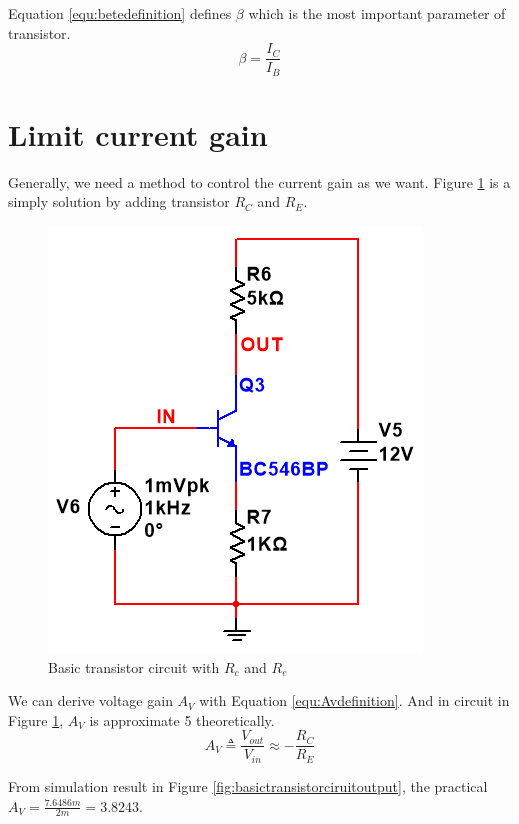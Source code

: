  Equation \ref{equ:betedefinition} defines $\beta$ which is the most important parameter of transistor.  
\begin{equation}
\beta = \frac{I_C}{I_B}
\label{equ:betedefinition}
\end{equation}


\section{Limit current gain} 
Generally, we need a method to control the current gain as we want. Figure \ref{fig:basictransistorcircuitwithRcandRe} is a simply solution by adding transistor $R_C$ and $R_E$.

\begin{figure}[htbp]
\centering
\includegraphics[scale=0.7]{"../Photo/Chap1/basic transistor circuit with Rc and Re"}
\caption{Basic transistor circuit with $R_c$ and $R_e$}
\label{fig:basictransistorcircuitwithRcandRe}
\end{figure}

We can derive voltage gain $A_V$ with Equation \ref{equ:Avdefinition}. And in circuit in Figure \ref{fig:basictransistorcircuitwithRcandRe}, $A_V$ is approximate 5 theoretically.
\begin{equation}
A_V \triangleq \frac{ V_{out}} { V_{in}} \approx -\frac{R_C}{R_E}
\label{equ:Avdefinition}
\end{equation}

From simulation result in Figure \ref{fig:basictransistorciruitoutput}, the practical $A_V = \frac{7.6486m}{2m}=3.8243$.


